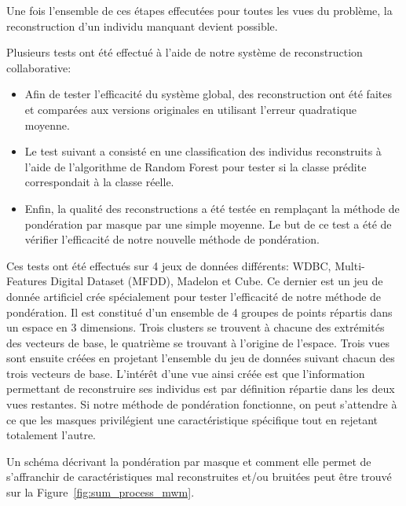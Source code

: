 \documentclass[a4paper]{article}
\begin{document}
    Une fois l'ensemble de ces étapes effecutées pour toutes les vues du problème, la reconstruction d'un individu manquant devient possible.

    Plusieurs tests ont été effectué à l'aide de notre système de reconstruction collaborative:
    \begin{itemize}
        \item Afin de tester l'efficacité du système global, des reconstruction ont été faites et comparées aux versions originales en utilisant l'erreur quadratique moyenne.
        \item Le test suivant a consisté en une classification des individus reconstruits à l'aide de l'algorithme de Random Forest pour tester si la classe prédite correspondait à la classe réelle.
        \item Enfin, la qualité des reconstructions a été testée en remplaçant la méthode de pondération par masque par une simple moyenne. Le but de ce test a été de vérifier l'efficacité de notre nouvelle méthode de pondération.
    \end{itemize}

    Ces tests ont été effectués sur 4 jeux de données différents: WDBC, Multi-Features Digital Dataset (MFDD), Madelon et Cube. Ce dernier est un jeu de donnée artificiel crée spécialement pour tester l'efficacité de notre méthode de pondération. Il est constitué d'un ensemble de 4 groupes de points répartis dans un espace en 3 dimensions. Trois clusters se trouvent à chacune des extrémités des vecteurs de base, le quatrième se trouvant à l'origine de l'espace. Trois vues sont ensuite créées en projetant l'ensemble du jeu de données suivant chacun des trois vecteurs de base. L'intér\^{e}t d'une vue ainsi créée est que l'information permettant de reconstruire ses individus est par définition répartie dans les deux vues restantes. Si notre méthode de pondération fonctionne, on peut s'attendre à ce que les masques privilégient une caractéristique spécifique tout en rejetant totalement l'autre.
    
    Un schéma décrivant la pondération par masque et comment elle permet de s'affranchir de caractéristiques mal reconstruites et/ou bruitées peut \^{e}tre trouvé sur la Figure~\ref{fig:sum_process_mwm}.
\end{document}

